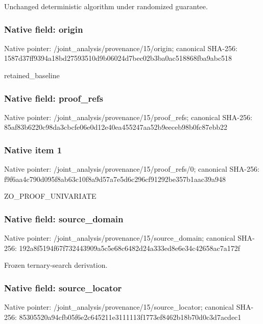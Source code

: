 \documentclass[10pt,a4paper]{article}
\begin{document}
\begingroup\raggedright\sloppy Unchanged deterministic algorithm under randomized guarantee.\par\endgroup

\subsubsection{Native field: origin}
Native pointer: /joint\_\allowbreak{}analysis/provenance/15/origin; canonical SHA-256: 1587d37ff9394a18bd27593510d9b06024d7bec02b3ba0ac518868fba9abc518

\begingroup\raggedright\sloppy retained\_\allowbreak{}baseline\par\endgroup

\subsubsection{Native field: proof\_\allowbreak{}refs}
Native pointer: /joint\_\allowbreak{}analysis/provenance/15/proof\_\allowbreak{}refs; canonical SHA-256: 85af83b6220c98da3cbcfe06e0d12e40ea455247aa52b9eeceb98b0fc87ebb22

\subsubsection{Native item 1}
Native pointer: /joint\_\allowbreak{}analysis/provenance/15/proof\_\allowbreak{}refs/0; canonical SHA-256: f9f6aa4c790d095f8ab63c10f8a9d57a7e5d6c296cf91292be357b1aac39a948

\begingroup\raggedright\sloppy ZO\_\allowbreak{}PROOF\_\allowbreak{}UNIVARIATE\par\endgroup

\subsubsection{Native field: source\_\allowbreak{}domain}
Native pointer: /joint\_\allowbreak{}analysis/provenance/15/source\_\allowbreak{}domain; canonical SHA-256: 192a8f5194f67f732443909a5c5e68c6482d24a333ed8e6e34c42658ac7a172f

\begingroup\raggedright\sloppy Frozen ternary-search derivation.\par\endgroup

\subsubsection{Native field: source\_\allowbreak{}locator}
Native pointer: /joint\_\allowbreak{}analysis/provenance/15/source\_\allowbreak{}locator; canonical SHA-256: 85305520a94cfb05f6e2c645211e3111113f1773ef8462b18b70d0c3d7acdec1
\end{document}
